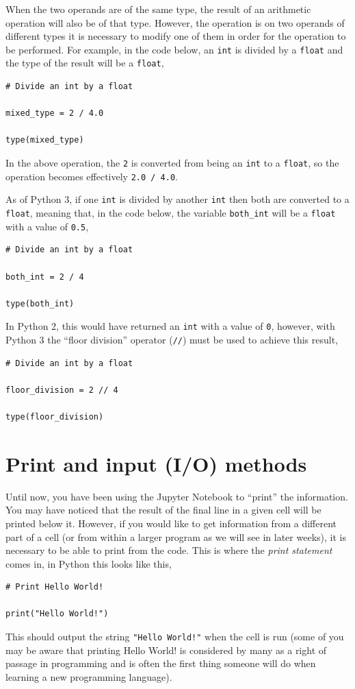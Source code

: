 \documentclass[a4paper]{article}
\begin{document}
When the two operands are of the same type, the result of an arithmetic operation will also be of that type. 
However, the operation is on two operands of different types it is necessary to modify one of them in order for the operation to be performed. 
For example, in the code below, an \texttt{int} is divided by a \texttt{float} and the type of the result will be a \texttt{float}, 
\begin{lstlisting}
# Divide an int by a float 

mixed_type = 2 / 4.0

type(mixed_type)
\end{lstlisting}
In the above operation, the \texttt{2} is converted from being an \texttt{int} to a \texttt{float}, so the operation becomes effectively \texttt{2.0 / 4.0}. 

As of Python 3, if one \texttt{int} is divided by another \texttt{int} then both are converted to a \texttt{float}, meaning that, in the code below, the variable \texttt{both\_int} will be a \texttt{float} with a value of \texttt{0.5}, 
\begin{lstlisting}
# Divide an int by a float 

both_int = 2 / 4

type(both_int)
\end{lstlisting}
In Python 2, this would have returned an \texttt{int} with a value of \texttt{0}, however, with Python 3 the ``floor division'' operator (\texttt{//}) must be used to achieve this result,
\begin{lstlisting}
# Divide an int by a float 

floor_division = 2 // 4

type(floor_division)
\end{lstlisting}

\section{Print and input (I/O) methods}

Until now, you have been using the Jupyter Notebook to ``print'' the information. 
You may have noticed that the result of the final line in a given cell will be printed below it. 
However, if you would like to get information from a different part of a cell (or from within a larger program as we will see in later weeks), it is necessary to be able to print from the code. 
This is where the \emph{print statement} comes in, in Python this looks like this, 
\begin{lstlisting}
# Print Hello World!

print("Hello World!")
\end{lstlisting}
This should output the string \texttt{"Hello World!"} when the cell is run (some of you may be aware that printing Hello World! is considered by many as a right of passage in programming and is often the first thing someone will do when learning a new programming language). 
\end{document}

